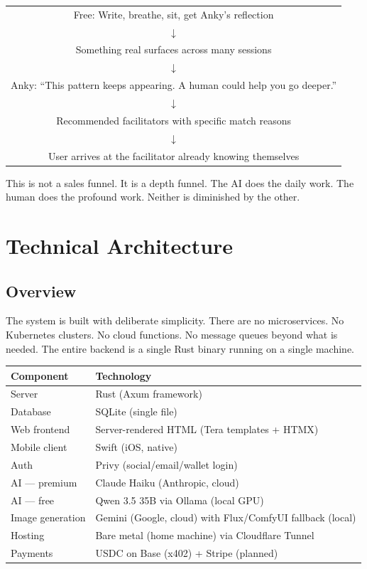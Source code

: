 \documentclass[12pt, a4paper]{article}
\begin{document}
\begin{center}
\begin{tabular}{c}
Free: Write, breathe, sit, get Anky's reflection \\
$\downarrow$ \\
Something real surfaces across many sessions \\
$\downarrow$ \\
Anky: ``This pattern keeps appearing. A human could help you go deeper.'' \\
$\downarrow$ \\
Recommended facilitators with specific match reasons \\
$\downarrow$ \\
User arrives at the facilitator already knowing themselves \\
\end{tabular}
\end{center}

This is not a sales funnel. It is a depth funnel. The AI does the daily work. The human does the profound work. Neither is diminished by the other.

\section{Technical Architecture}

\subsection{Overview}

The system is built with deliberate simplicity. There are no microservices. No Kubernetes clusters. No cloud functions. No message queues beyond what is needed. The entire backend is a single Rust binary running on a single machine.

\begin{center}
\begin{tabular}{ll}
\hline
\textbf{Component} & \textbf{Technology} \\
\hline
Server & Rust (Axum framework) \\
Database & SQLite (single file) \\
Web frontend & Server-rendered HTML (Tera templates + HTMX) \\
Mobile client & Swift (iOS, native) \\
Auth & Privy (social/email/wallet login) \\
AI --- premium & Claude Haiku (Anthropic, cloud) \\
AI --- free & Qwen 3.5 35B via Ollama (local GPU) \\
Image generation & Gemini (Google, cloud) with Flux/ComfyUI fallback (local) \\
Hosting & Bare metal (home machine) via Cloudflare Tunnel \\
Payments & USDC on Base (x402) + Stripe (planned) \\
\hline
\end{tabular}
\end{center}
\end{document}
